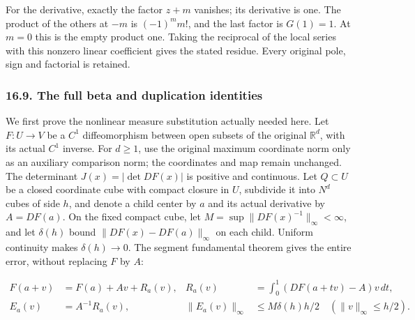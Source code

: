 \documentclass[
  11pt,
]{article}
\makeatletter
\let\ReaderOriginalAnchorStart\hyper@anchorstart
\let\ReaderOriginalAnchorEnd\hyper@anchorend
\let\ReaderPendingAliases\@empty
\def\ReaderArmAliases#1{\gdef\ReaderPendingAliases{#1}}
\def\hyper@anchorstart#1{\ReaderIfNativeAnchorTF{#1}{\ReaderPendingAliases\global\let\ReaderPendingAliases\@empty}{}\ReaderOriginalAnchorStart{#1}}
\makeatother
\begin{document}
For the derivative, exactly the factor \(z+m\) vanishes; its derivative
is one. The product of the others at \(-m\) is \((-1)^m m!\), and the
last factor is \(G(1)=1\). At \(m=0\) this is the empty product one.
Taking the reciprocal of the local series with this nonzero linear
coefficient gives the stated residue. Every original pole, sign and
factorial is retained.

\ReaderArmAliases{\ReaderOriginalAnchorStart{AN03-CN-COMPLEX-009}\ReaderOriginalAnchorEnd\begingroup\expandafter\def\csname @currentHref\endcsname{AN03-CN-COMPLEX-009}\label{AN03-CN-COMPLEX-009}\endgroup\ReaderOriginalAnchorStart{the-full-beta-and-duplication-identities}\ReaderOriginalAnchorEnd}
\subsubsection{16.9. The full beta and duplication
identities}\label{the-full-beta-and-duplication-identities}

We first prove the nonlinear measure substitution actually needed here.
Let \(F:U\to V\) be a \(C^1\) diffeomorphism between open subsets of the
original \(\mathbb R^d\), with its actual \(C^1\) inverse. For
\(d\geq1\), use the original maximum coordinate norm only as an
auxiliary comparison norm; the coordinates and map remain unchanged. The
determinant \(J(x)=|\det DF(x)|\) is positive and continuous. Let
\(Q\subset U\) be a closed coordinate cube with compact closure in
\(U\), subdivide it into \(N^d\) cubes of side \(h\), and denote a child
center by \(a\) and its actual derivative by \(A=DF(a)\). On the fixed
compact cube, let \(M=\sup\|DF(x)^{-1}\|_\infty<\infty\), and let
\(\delta(h)\) bound \(\|DF(x)-DF(a)\|_\infty\) on each child. Uniform
continuity makes \(\delta(h)\to0\). The segment fundamental theorem
gives the entire error, without replacing \(F\) by \(A\):

\[
\begin{aligned}
F(a+v)&=F(a)+Av+R_a(v),&
R_a(v)&=\int_0^1(DF(a+tv)-A)v\,dt,\\
E_a(v)&=A^{-1}R_a(v),&
\|E_a(v)\|_\infty&\leq M\delta(h)h/2
       \quad(\|v\|_\infty\leq h/2).
\end{aligned}
\tag{CX35a}
\]
\end{document}
